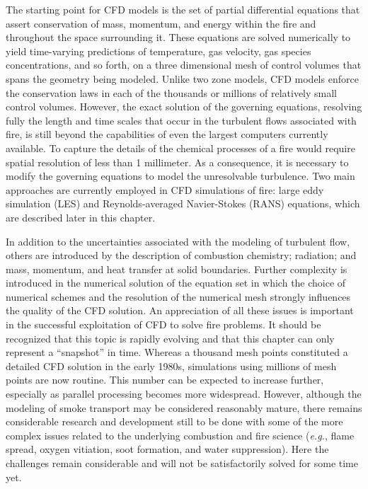 \documentclass[graybox]{svmult}
\begin{document}
The starting point for CFD models is the set of partial differential equations that assert conservation of mass, momentum, and energy within the fire and throughout the space surrounding it. These equations are solved numerically to yield time-varying predictions of temperature,  gas  velocity,  gas species concentrations, and so forth, on a three dimensional mesh of control volumes that spans the geometry being modeled. Unlike two zone models, CFD models enforce the conservation laws in each of the thousands or millions of relatively small control volumes. However, the exact solution of the governing equations, resolving fully the length and time scales that occur in the turbulent flows associated with fire, is still beyond the capabilities of even the largest computers currently available. To capture the details of the chemical processes of a fire would require spatial resolution of less than 1 millimeter. As a consequence, it is necessary to modify the governing equations to model the unresolvable turbulence. Two main approaches are currently employed in CFD simulations of fire: large eddy simulation (LES) and Reynolds-averaged Navier-Stokes (RANS) equations, which are described later in this chapter.

In addition to the uncertainties associated with the modeling of turbulent flow, others are introduced by the description of combustion chemistry; radiation; and mass, momentum, and heat transfer at solid boundaries. Further complexity is introduced in the numerical solution of the equation set in which the choice of numerical schemes and the resolution of the numerical mesh strongly influences the quality of the CFD solution. An appreciation of all these issues is important in the successful exploitation of CFD to solve fire problems.
It should be recognized that this topic is rapidly evolving and that this chapter can only represent a ``snapshot'' in time. Whereas a thousand mesh points constituted a detailed CFD solution in the early 1980s, simulations using millions of mesh points are now routine. This number can be expected to increase further, especially as parallel processing becomes more widespread. However, although the modeling of smoke transport may be considered reasonably mature, there remains considerable research and development still to be done with some of the more complex issues related to the underlying combustion and fire science ({\em e.g.}, flame spread, oxygen vitiation, soot formation, and water suppression). Here the challenges remain considerable and will not be satisfactorily solved for some time yet.
\end{document}
